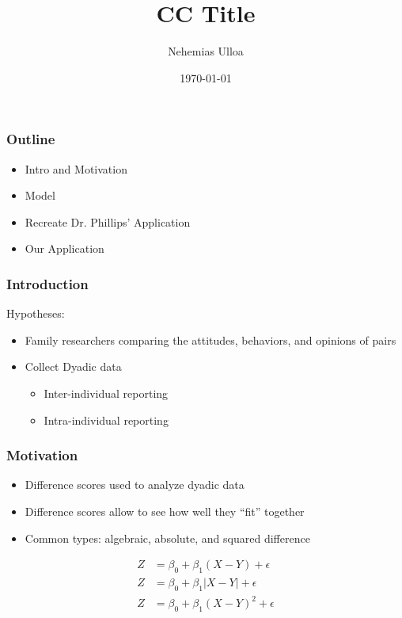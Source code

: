 \documentclass{beamer}\usepackage[]{graphicx}\usepackage[]{color}
\title[CC Title]{CC Title}
\author{Nehemias Ulloa}
\institute{\Large{Department of Statistics\\ Iowa State University}}
\date{\today}
\begin{document}
\begin{frame}
\titlepage
\end{frame}


\begin{frame}
\frametitle{Outline}
\begin{itemize}
\item Intro and Motivation
\item Model
\item Recreate Dr. Phillips' Application
\item Our Application
\end{itemize}
\end{frame}



\begin{frame}
\frametitle{Introduction}
Hypotheses:
\begin{itemize}
  \item Family researchers comparing the attitudes, behaviors, and opinions of pairs
  \item Collect Dyadic data
    \begin{itemize}
      \item Inter-individual reporting
      \item Intra-individual reporting
    \end{itemize}
\end{itemize}
\end{frame}

\begin{frame}
\frametitle{Motivation}
\begin{itemize}
  \item Difference scores used to analyze dyadic data
  \item Difference scores allow to see how well they ``fit'' together
  \item Common types: algebraic, absolute, and squared difference
\end{itemize}

\begin{align}
Z &= \beta_0 + \beta_1 (X - Y) + \epsilon \label{eq:diffscore} \\
Z &= \beta_0 + \beta_1 |X - Y| + \epsilon \label{eq:absdiffscore} \\
Z &= \beta_0 + \beta_1 (X - Y)^2 + \epsilon \label{eq:squarediffscore}
\end{align}
\end{frame}
\end{document}
